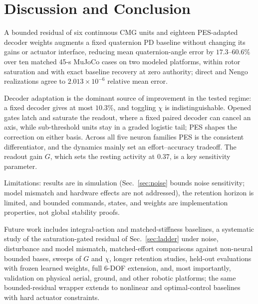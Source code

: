 \documentclass[letterpaper, 10 pt, conference]{ieeeconf}
\begin{document}
\section{Discussion and Conclusion}
\label{sec:conclusion}

A bounded residual of six continuous CMG units and eighteen PES-adapted decoder weights augments a fixed quaternion PD baseline without changing its gains or actuator interface, reducing mean quaternion-angle error by $17.3$--$60.6\%$ over ten matched 45-s MuJoCo cases on two modeled platforms, within rotor saturation and with exact baseline recovery at zero authority; direct and Nengo realizations agree to $2.013\times10^{-6}$ relative mean error.

Decoder adaptation is the dominant source of improvement in the tested regime: a fixed decoder gives at most $10.3\%$, and toggling $\chi$ is indistinguishable. Opened gates latch and saturate the readout, where a fixed paired decoder can cancel an axis, while sub-threshold units stay in a graded logistic tail; PES shapes the correction on either basis. Across all five neuron families PES is the consistent differentiator, and the dynamics mainly set an effort--accuracy tradeoff. The readout gain $G$, which sets the resting activity at $0.37$, is a key sensitivity parameter.

Limitations: results are in simulation (Sec.~\ref{sec:noise} bounds noise sensitivity; model mismatch and hardware effects are not addressed), the retention horizon is limited, and bounded commands, states, and weights are implementation properties, not global stability proofs.

Future work includes integral-action and matched-stiffness baselines, a systematic study of the saturation-gated residual of Sec.~\ref{sec:ladder} under noise, disturbance and model mismatch, matched-effort comparisons against non-neural bounded bases, sweeps of $G$ and $\chi$, longer retention studies, held-out evaluations with frozen learned weights, full 6-DOF extension, and, most importantly, validation on physical aerial, ground, and other robotic platforms; the same bounded-residual wrapper extends to nonlinear and optimal-control baselines with hard actuator constraints.


\end{document}
